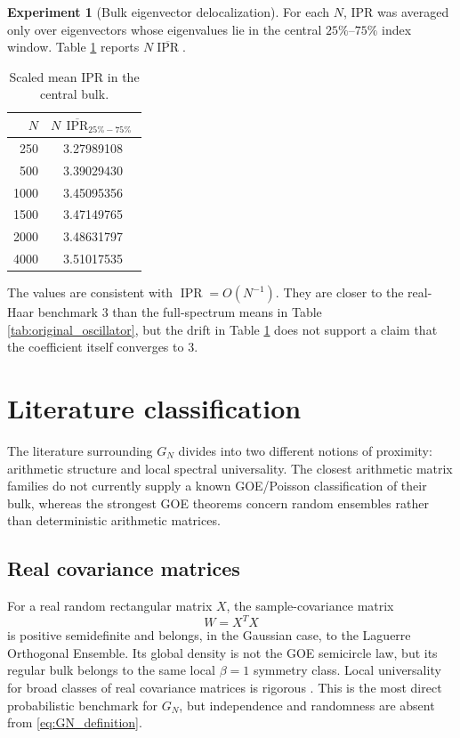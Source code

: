 \documentclass[11pt]{amsart}
\numberwithin{equation}{section}
\theoremstyle{plain}
\theoremstyle{definition}
\newtheorem{experiment}[theorem]{Experiment}
\theoremstyle{remark}
\newcommand{\IPR}{\operatorname{IPR}}
\begin{document}
\begin{experiment}[Bulk eigenvector delocalization]
\label{exp:bulk_ipr}
For each $N$, IPR was averaged only over eigenvectors whose eigenvalues lie in the central $25\%$--$75\%$ index window.  Table \ref{tab:bulk_ipr} reports $N\overline{\IPR}$.

\begin{table}[htbp]
\centering
\caption{Scaled mean IPR in the central bulk.}
\label{tab:bulk_ipr}
\begin{tabular}{rc}
\toprule
$N$ & $N\,\overline{\IPR}_{25\%-75\%}$\\
\midrule
250  & 3.27989108\\
500  & 3.39029430\\
1000 & 3.45095356\\
1500 & 3.47149765\\
2000 & 3.48631797\\
4000 & 3.51017535\\
\bottomrule
\end{tabular}
\end{table}

The values are consistent with $\IPR=O(N^{-1})$.  They are closer to the real-Haar benchmark $3$ than the full-spectrum means in Table \ref{tab:original_oscillator}, but the drift in Table \ref{tab:bulk_ipr} does not support a claim that the coefficient itself converges to $3$.
\end{experiment}

\section{Literature classification}
\label{sec:literature_classification}

The literature surrounding $G_N$ divides into two different notions of proximity: arithmetic structure and local spectral universality.  The closest arithmetic matrix families do not currently supply a known GOE/Poisson classification of their bulk, whereas the strongest GOE theorems concern random ensembles rather than deterministic arithmetic matrices.

\subsection{Real covariance matrices}
\label{subsec:covariance_literature}

For a real random rectangular matrix $X$, the sample-covariance matrix
\begin{equation}
W=X^TX
\label{eq:wishart_matrix}
\end{equation}
is positive semidefinite and belongs, in the Gaussian case, to the Laguerre Orthogonal Ensemble.  Its global density is not the GOE semicircle law, but its regular bulk belongs to the same local $\beta=1$ symmetry class.  Local universality for broad classes of real covariance matrices is rigorous \cite{TaoVu2012,PillaiYin2014}.  This is the most direct probabilistic benchmark for $G_N$, but independence and randomness are absent from \eqref{eq:GN_definition}.
\end{document}
